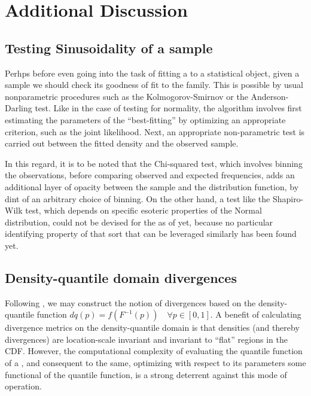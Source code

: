\section{Additional Discussion}
\subsection{Testing Sinusoidality of a sample}
Perhps before even going into the task of fitting a \sindist{} to a statistical object, given a sample we should check its goodness of fit to the \sindist{} family. This is possible by usual nonparametric procedures such as the Kolmogorov-Smirnov or the Anderson-Darling test. Like in the case of testing for normality, the algorithm involves first estimating the parameters of the ``best-fitting'' \sindist{} by optimizing an appropriate criterion, such as the joint likelihood. Next, an appropriate non-parametric test is carried out between the fitted density and the observed sample.

In this regard, it is to be noted that the Chi-squared test, which involves binning the observations, before comparing observed and expected frequencies, adds an additional layer of opacity between the sample and the distribution function, by dint of an arbitrary choice of binning. On the other hand, a test like the Shapiro-Wilk test, which depends on specific esoteric properties of the Normal distribution, could not be devised for the \sindist{} as of yet, because no particular identifying property of that sort that can be leveraged similarly has been found yet.

\subsection{Density-quantile domain divergences}
Following \cite{staudte2017dqf}, we may construct the notion of divergences based on the density-quantile function $dq(p) = f(F^{-1}(p)) \quad \forall p \in [0,1]$. A benefit of calculating divergence metrics on the density-quantile domain is that densities (and thereby divergences) are location-scale invariant and invariant to ``flat'' regions in the CDF. However, the computational complexity of evaluating the quantile function of a \sindist{}, and consequent to the same, optimizing with respect to its parameters some functional of the quantile function, is a strong deterrent against this mode of operation.


